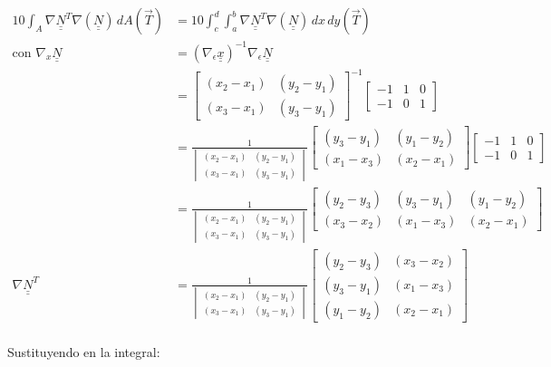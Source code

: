 \documentclass[10pt]{article}
\def\doubleunderline#1{\underline{\underline{#1}}}
\begin{document}
\begin{align*}
10 \int_A \nabla \doubleunderline{N}^T \nabla (\doubleunderline{N} ) \,d A (\vec{T}) &= 10 \int_{c}^{d} \int_{a}^{b} \nabla \doubleunderline{N}^T \nabla (\doubleunderline{N} ) \,d x \,d y (\vec{T}) \\
\text{con } \nabla_{x} \doubleunderline{N} & = (\nabla_{\epsilon} \doubleunderline{x})^{-1} \nabla_{\epsilon} \doubleunderline{N} \\
&= \begin{bmatrix}
(x_2-x_1) & (y_2-y_1) \\
(x_3-x_1) & (y_3-y_1)
\end{bmatrix}^{-1}
\begin{bmatrix}
-1 & 1 & 0 \\
-1 & 0 & 1
\end{bmatrix} \\
& = \frac{1}{\begin{vmatrix}
(x_2-x_1) & (y_2-y_1) \\
(x_3-x_1) & (y_3-y_1)
\end{vmatrix}} \begin{bmatrix}
(y_3-y_1) & (y_1-y_2) \\
(x_1-x_3) & (x_2-x_1)
\end{bmatrix} \begin{bmatrix}
-1 & 1 & 0 \\
-1 & 0 & 1
\end{bmatrix} \\
&=\frac{1}{\begin{vmatrix}
(x_2-x_1) & (y_2-y_1) \\
(x_3-x_1) & (y_3-y_1)
\end{vmatrix}} \begin{bmatrix}
(y_2 - y_3) & (y_3-y_1) & (y_1-y_2) \\
(x_3 - x_2) & (x_1-x_3) & (x_2-x_1)
\end{bmatrix} \\
\nabla \doubleunderline{N}^T &=\frac{1}{\begin{vmatrix}
(x_2-x_1) & (y_2-y_1) \\
(x_3-x_1) & (y_3-y_1)
\end{vmatrix}} \begin{bmatrix}
(y_2 - y_3) & (x_3 - x_2)\\
 (y_3-y_1) & (x_1-x_3) \\
 (y_1-y_2) & (x_2-x_1)
\end{bmatrix}
\end{align*}\\
Sustituyendo en la integral: \\
\end{document}
